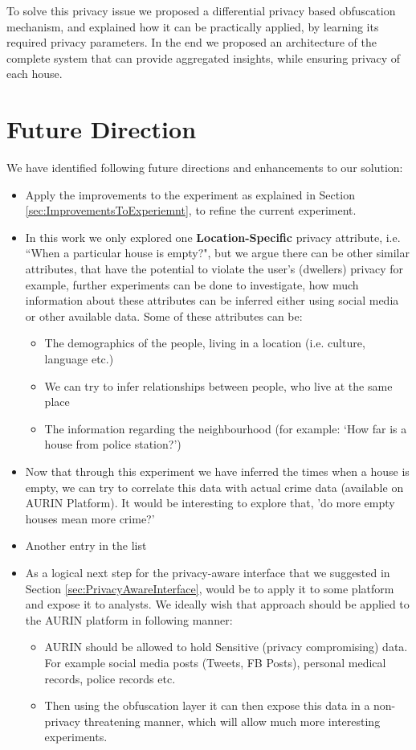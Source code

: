 \documentclass[12pt]{report}
\theoremstyle{named}
\begin{document}
To solve this privacy issue we proposed a differential privacy based obfuscation mechanism, and explained how it can be practically applied, by learning its required privacy parameters. In the end we proposed an architecture of the complete system that can provide aggregated insights, while ensuring privacy of each house.


\section{Future Direction}
We have identified following future directions and enhancements to our solution:
\begin{itemize}
  \item Apply the improvements to the experiment as explained in Section \ref{sec:ImprovementsToExperiemnt}, to refine the current experiment.
  \item In this work we only explored one \textbf{Location-Specific} privacy attribute, i.e. ``When a particular house is empty?", but we argue there can be other similar attributes, that have the potential to violate the user's (dwellers) privacy for example, further experiments can be done to investigate, how much information about these attributes can be inferred either using social media or other available data. Some of these attributes can be:
  \begin{itemize}
  \item The demographics of the people, living in a location (i.e. culture, language etc.)
  \item We can try to infer relationships between people, who live at the same place
  \item The information regarding the neighbourhood (for example: `How far is a house from police station?')
    \end{itemize}
    \item Now that through this experiment we have inferred the times when a house is empty, we can try to correlate this data with actual crime data (available on AURIN Platform). It would be interesting to explore that, 'do more empty houses mean more crime?'
  \item Another entry in the list
\item As a logical next step for the privacy-aware interface that we suggested in Section \ref{sec:PrivacyAwareInterface}, would be to apply it to some platform and expose it to analysts. We ideally wish that approach should be applied to the AURIN platform in following manner:
  \begin{itemize}
  \item AURIN should be allowed to hold Sensitive (privacy compromising) data. For example social media posts (Tweets, FB Posts), personal medical records, police records etc.
  \item Then using the obfuscation layer it can then expose this data in a non-privacy threatening manner, which will allow much more interesting experiments.
    \end{itemize}

\end{itemize}
\end{document}

